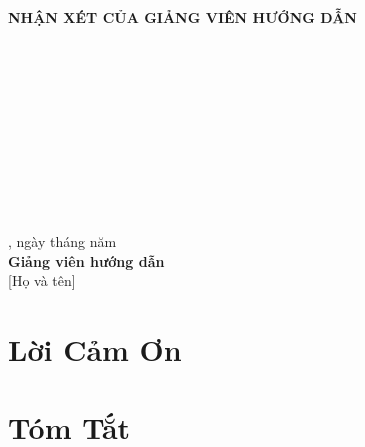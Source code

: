 \documentclass[13pt, a4paper]{report}
\begin{document}
\newpage\thispagestyle{empty}
\begin{center}{\Large\bfseries NHẬN XÉT CỦA GIẢNG VIÊN HƯỚNG DẪN}\end{center}
\vspace{1cm}
\dotfill\\[0.8cm]\dotfill\\[0.8cm]\dotfill\\[0.8cm]
\dotfill\\[0.8cm]\dotfill\\[0.8cm]\dotfill\\[0.8cm]
\dotfill\\[0.8cm]\dotfill\\[0.8cm]\dotfill\\[0.8cm]
\vfill
\begin{flushright}
  , ngày \underline{\hspace{0.8cm}} tháng \underline{\hspace{0.8cm}} năm \underline{\hspace{1.2cm}}\\[0.5cm]
  \textbf{Giảng viên hướng dẫn}\\[1.5cm]
  [Họ và tên]
\end{flushright}

\chapter*{Lời Cảm Ơn}


\chapter*{Tóm Tắt}


\tableofcontents
\listoffigures
\listoftables










\end{document}
